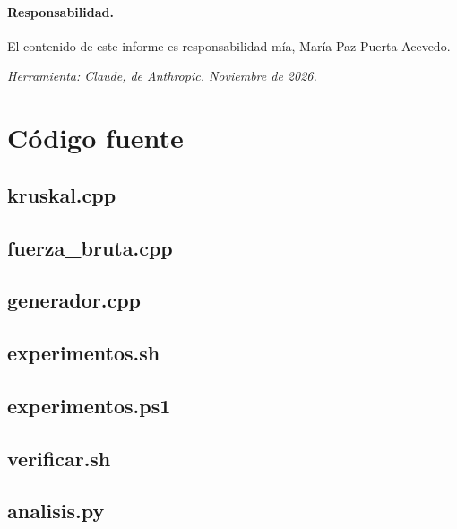\documentclass[11pt,a4paper]{article}
\begin{document}
\paragraph{Responsabilidad.} El contenido de este informe es responsabilidad mía, María Paz Puerta Acevedo.

\medskip
\noindent\textit{Herramienta: Claude, de Anthropic. Noviembre de 2026.}

\appendix
\section{Código fuente}
\subsection{kruskal.cpp}

\subsection{fuerza\_bruta.cpp}

\subsection{generador.cpp}

\subsection{experimentos.sh}

\subsection{experimentos.ps1}

\subsection{verificar.sh}

\subsection{analisis.py}

\end{document}
